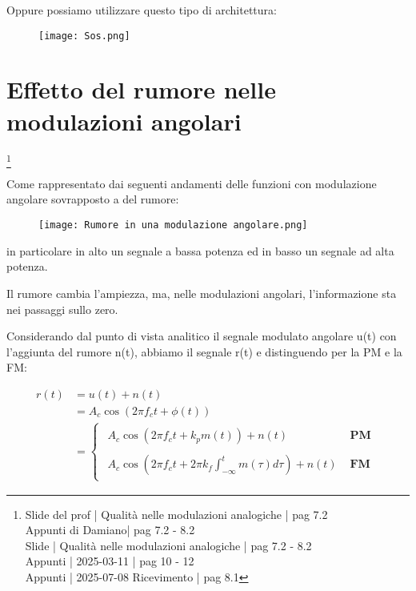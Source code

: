 \newpage 

Oppure possiamo utilizzare questo tipo di architettura: 

\begin{figure}[h]
    \centering
    \texttt{[image: Sos.png]}
\end{figure} 

\newpage 

\section{Effetto del rumore nelle modulazioni angolari}
\footnote{Slide del prof | Qualità nelle modulazioni analogiche | pag 7.2 \\  
Appunti di Damiano| pag 7.2 - 8.2\\
Slide | Qualità nelle modulazioni analogiche | pag 7.2 - 8.2 \\
Appunti | 2025-03-11 | pag 10 - 12 \\ 
Appunti | 2025-07-08 Ricevimento | pag 8.1
} 

Come rappresentato dai seguenti andamenti delle funzioni con modulazione angolare sovrapposto a del rumore: 

\begin{figure}[h]
    \centering
    \texttt{[image: Rumore in una modulazione angolare.png]}
\end{figure}

in particolare in alto un segnale a bassa potenza ed in basso un segnale ad alta potenza. \newline 

Il rumore cambia l'ampiezza, ma, nelle modulazioni angolari, l'informazione sta nei passaggi sullo zero. \newline 

Considerando dal punto di vista analitico il segnale modulato angolare u(t) con l'aggiunta del rumore n(t), 
abbiamo il segnale r(t) e distinguendo per la PM e la FM: 

{
    \Large 
    \begin{equation}
        \begin{split}
        r(t)
        &= 
        u(t)
        + 
        n(t)
        \\
        &= 
        A_c \cos(2 \pi f_c t + \phi (t))
        \\
        &= 
        \begin{cases}
            \begin{array}{ll}
            A_c \cos(2 \pi f_c t + k_p m(t)) + n(t) & \textbf{ PM} 
            \\
            \\
            A_c \cos \left( 2 \pi f_c t + 2 \pi k_f \int_{-\infty}^{t} m(\tau) d\tau \right)+ n(t) & \textbf{ FM}
            \end{array} 
        \end{cases}
        \end{split}
    \end{equation}
}

